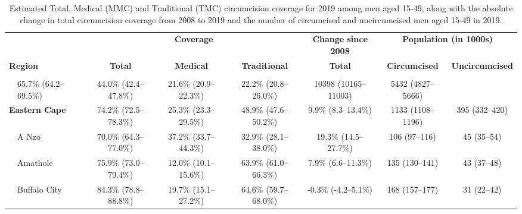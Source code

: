 \documentclass{article}
\begin{document}
\textwidth 7.25in

\begin{landscape}

  {
  \linespread{1}
    \newpage
    \small
    \begin{longtable}[c]{llc cc ccc}
      \hline
      & & \multicolumn{3}{c}{\textbf{Coverage}} & \textbf{Change since 2008}& \multicolumn{2}{c}{\textbf{Population (in 1000s)}}  \\[1pt]
      \cmidrule(lr){3-5}
      \cmidrule(lr){6-6}
      \cmidrule(lr){7-8}
      \multicolumn{2}{l}{\textbf{Region}} & \textbf{Total}  & \textbf{Medical} & \textbf{Traditional} & \textbf{Total} &  \textbf{Circumcised} & \textbf{Uncircumcised} \\[3pt]
      \hline
      \vspace{-5pt}
      \endhead
      \\[-5pt]\hline
      \caption{Estimated Total, Medical (MMC) and Traditional (TMC) circumcision coverage for 2019 among men aged 15-49, along with the absolute change in total circumcision coverage from 2008 to 2019 and the number of circumcised and uncircumcised men aged 15-49 in 2019.}
      \endfoot
      \multicolumn{2}{l}{\textbf{South Africa}} & 65.7\% (64.2--69.5\%) & 44.0\% (42.4--47.8\%) & 21.6\% (20.9--22.3\%) & 22.2\% (20.8--26.0\%) & 10398 (10165--11003) & 5432 (4827--5666) \\[5pt]
      \multicolumn{2}{l}{\textbf{Eastern Cape}}  & 74.2\% (72.5--78.3\%) & 25.3\% (23.3--29.5\%) & 48.9\% (47.6--50.2\%) & 9.9\% (8.3--13.4\%) & 1133 (1108--1196) & 395 (332--420) \\
      & A Nzo & 70.0\% (64.3--77.0\%) & 37.2\% (33.7--44.3\%) & 32.9\% (28.1--38.0\%) & 19.3\% (14.5--27.7\%) & 106 (97--116) & 45 (35--54) \\
      & Amathole & 75.9\% (73.0--79.4\%) & 12.0\% (10.1--15.6\%) & 63.9\% (61.0--66.3\%) & 7.9\% (6.6--11.3\%) & 135 (130--141) & 43 (37--48) \\
      & Buffalo City & 84.3\% (78.8--88.8\%) & 19.7\% (15.1--27.2\%) & 64.6\% (59.7--68.0\%) & -0.3\% (-4.2--5.1\%) & 168 (157--177) & 31 (22--42) \\

\end{longtable}}
\end{landscape}
\end{document}
